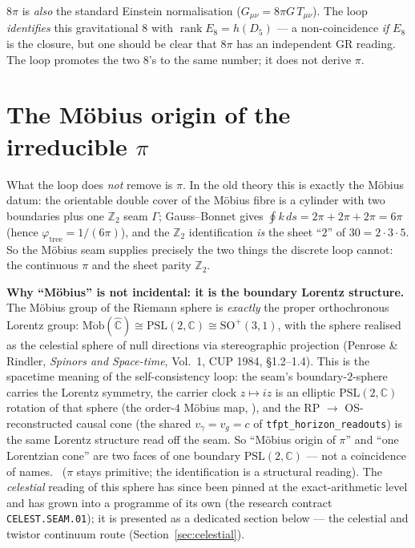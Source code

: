 \documentclass[11pt,a4paper]{article}
\newcommand{\Z}{\mathbb{Z}}
\theoremstyle{definition}
\begin{document}
\begin{gapbox}
$8\pi$ is \emph{also} the standard Einstein normalisation ($G_{\mu\nu}=8\pi G\,T_{\mu\nu}$). The loop
\emph{identifies} this gravitational $8$ with $\operatorname{rank}E_8=h(D_5)$ --- a non-coincidence
\emph{if} $E_8$ is the closure, but one should be clear that $8\pi$ has an independent GR reading. The
loop promotes the two $8$'s to the same number; it does not derive $\pi$.
\end{gapbox}

\section{The Möbius origin of the irreducible $\pi$}
What the loop does \emph{not} remove is $\pi$. In the old theory this is exactly the Möbius datum: the
orientable double cover of the Möbius fibre is a cylinder with two boundaries plus one $\Z_2$ seam
$\Gamma$; Gauss--Bonnet gives $\oint k\,ds=2\pi+2\pi+2\pi=6\pi$ (hence $\varphi_{\mathrm{tree}}=1/(6\pi)$),
and the $\Z_2$ identification \emph{is} the sheet ``$2$'' of $30=2\cdot3\cdot5$. So the Möbius seam
supplies precisely the two things the discrete loop cannot: the continuous $\pi$ and the sheet parity
$\Z_2$.

\par\smallskip\noindent\textbf{Why ``Möbius'' is not incidental: it is the boundary Lorentz structure.}
The Möbius group of the Riemann sphere is \emph{exactly} the proper orthochronous Lorentz group:
$\mathrm{M\ddot{o}b}(\hat{\mathbb C})\cong\mathrm{PSL}(2,\mathbb C)\cong\mathrm{SO}^+(3,1)$, with the sphere
realised as the celestial sphere of null directions via stereographic projection (Penrose \& Rindler,
\emph{Spinors and Space-time}, Vol.~1, CUP 1984, \S1.2--1.4). This is the spacetime meaning of the
self-consistency loop: the seam's boundary-$2$-sphere carries the Lorentz symmetry, the carrier clock
$z\mapsto iz$ is an elliptic $\mathrm{PSL}(2,\mathbb C)$ rotation of that sphere (the order-$4$ Möbius map,
), and the RP $\to$ OS-reconstructed causal cone (the shared
$v_\gamma=v_g=c$ of \texttt{tfpt\_horizon\_readouts}) is the same Lorentz structure read off the seam. So
``Möbius origin of $\pi$'' and ``one Lorentzian cone'' are two faces of one boundary $\mathrm{PSL}(2,\mathbb C)$
--- not a coincidence of names. \mO\ ($\pi$ stays primitive; the identification is a structural reading).
The \emph{celestial} reading of this sphere has since been pinned at the exact-arithmetic level and has
grown into a programme of its own (the research contract \texttt{CELEST.SEAM.01}); it is
presented as a dedicated section below --- the celestial and twistor continuum route
(Section~\ref{sec:celestial}).
\end{document}
